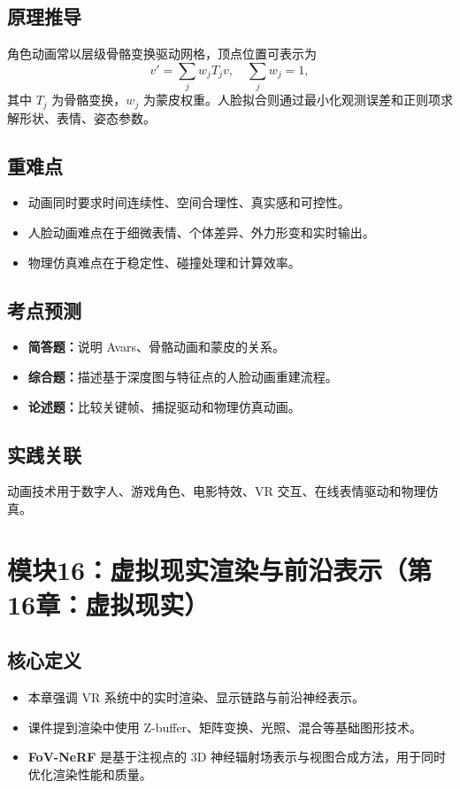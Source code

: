 \documentclass[UTF8,fontset=fandol,11pt]{ctexart}
\newcommand{\key}[1]{\textbf{#1}}
\newcommand{\exam}[1]{\textcolor{blue!55!black}{\textbf{#1}}}
\begin{document}
\subsection{原理推导}
角色动画常以层级骨骼变换驱动网格，顶点位置可表示为
\[
  v'=\sum_j w_j T_j v,\quad \sum_j w_j=1,
\]
其中 $T_j$ 为骨骼变换，$w_j$ 为蒙皮权重。人脸拟合则通过最小化观测误差和正则项求解形状、表情、姿态参数。
\subsection{重难点}
\begin{itemize}
  \item 动画同时要求时间连续性、空间合理性、真实感和可控性。
  \item 人脸动画难点在于细微表情、个体差异、外力形变和实时输出。
  \item 物理仿真难点在于稳定性、碰撞处理和计算效率。
\end{itemize}
\subsection{考点预测}
\begin{itemize}
  \item \exam{简答题：}说明 Avars、骨骼动画和蒙皮的关系。
  \item \exam{综合题：}描述基于深度图与特征点的人脸动画重建流程。
  \item \exam{论述题：}比较关键帧、捕捉驱动和物理仿真动画。
\end{itemize}
\subsection{实践关联}
动画技术用于数字人、游戏角色、电影特效、VR 交互、在线表情驱动和物理仿真。

\section{模块16：虚拟现实渲染与前沿表示（第16章：虚拟现实）}
\subsection{核心定义}
\begin{itemize}
  \item 本章强调 VR 系统中的实时渲染、显示链路与前沿神经表示。
  \item 课件提到渲染中使用 Z-buffer、矩阵变换、光照、混合等基础图形技术。
  \item \key{FoV-NeRF} 是基于注视点的 3D 神经辐射场表示与视图合成方法，用于同时优化渲染性能和质量。
\end{itemize}
\end{document}
